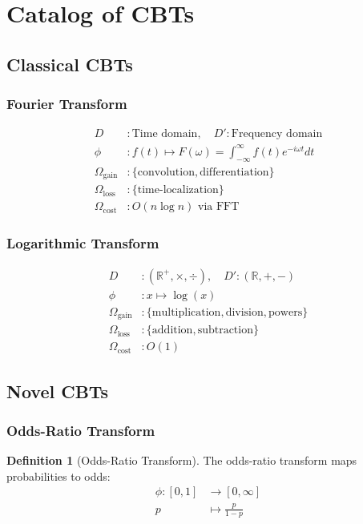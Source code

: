 \documentclass[12pt,a4paper]{article}
\theoremstyle{definition}
\newtheorem{definition}{Definition}
\begin{document}
\section{Catalog of CBTs}

\subsection{Classical CBTs}

\subsubsection{Fourier Transform}
\begin{align}
D &: \text{Time domain}, \quad D': \text{Frequency domain}\\
\phi &: f(t) \mapsto F(\omega) = \int_{-\infty}^{\infty} f(t) e^{-i\omega t} dt\\
\Omega_{\text{gain}} &: \{\text{convolution}, \text{differentiation}\}\\
\Omega_{\text{loss}} &: \{\text{time-localization}\}\\
\Omega_{\text{cost}} &: O(n \log n) \text{ via FFT}
\end{align}

\subsubsection{Logarithmic Transform}
\begin{align}
D &: (\mathbb{R}^+, \times, \div), \quad D': (\mathbb{R}, +, -)\\
\phi &: x \mapsto \log(x)\\
\Omega_{\text{gain}} &: \{\text{multiplication}, \text{division}, \text{powers}\}\\
\Omega_{\text{loss}} &: \{\text{addition}, \text{subtraction}\}\\
\Omega_{\text{cost}} &: O(1)
\end{align}

\subsection{Novel CBTs}

\subsubsection{Odds-Ratio Transform}
\begin{definition}[Odds-Ratio Transform]
The odds-ratio transform maps probabilities to odds:
\begin{align}
\phi: [0,1] &\to [0, \infty]\\
p &\mapsto \frac{p}{1-p}
\end{align}
\end{definition}
\end{document}

